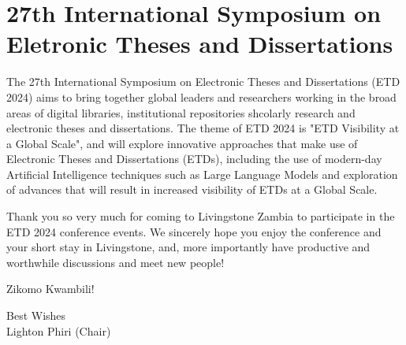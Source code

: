 \section{27th International Symposium on Eletronic Theses and Dissertations}
The 27th International Symposium on Electronic Theses and Dissertations (ETD 2024) aims to bring together global leaders and researchers working in the broad areas of digital libraries, institutional repositories shcolarly research and electronic theses and dissertations. The theme of ETD 2024 is "ETD Visibility at a Global Scale", and will explore innovative approaches that make use of Electronic Theses and Dissertations (ETDs), including the use of modern-day Artificial Intelligence techniques such as Large Language Models and exploration of advances that will result in increased visibility of ETDs at a Global Scale.

Thank you so very much for coming to Livingstone Zambia to participate in the ETD 2024 conference events. We sincerely hope you enjoy the conference and your short stay in Livingstone, and, more importantly have productive and worthwhile discussions and meet new people!

Zikomo Kwambili!

\begin{minipage}[t]{\textwidth}
\raggedleft
Best Wishes\\
Lighton Phiri (Chair)
\end{minipage}

\newpage
